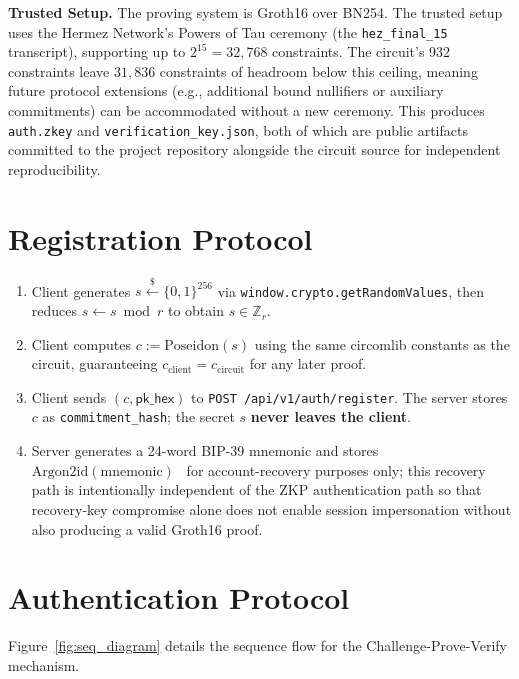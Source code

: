 \documentclass[12pt,a4paper,oneside]{report}
\begin{document}
\textbf{Trusted Setup.} The proving system is Groth16 over BN254. The
trusted setup uses the Hermez Network's Powers of Tau ceremony (the
\texttt{hez\_final\_15} transcript), supporting up to $2^{15} = 32{,}768$
constraints. The circuit's 932 constraints leave $31{,}836$ constraints of
headroom below this ceiling, meaning future protocol extensions (e.g.,
additional bound nullifiers or auxiliary commitments) can be accommodated
without a new ceremony. This produces \texttt{auth.zkey} and
\texttt{verification\_key.json}, both of which are public artifacts
committed to the project repository alongside the circuit source for
independent reproducibility.

\section{Registration Protocol}

\begin{enumerate}
  \item Client generates $s \xleftarrow{\$} \{0,1\}^{256}$ via
        \texttt{window.crypto.getRandomValues}, then reduces
        $s \leftarrow s \bmod r$ to obtain $s \in \mathbb{Z}_r$.
  \item Client computes $c := \text{Poseidon}(s)$ using the same
        circomlib constants as the circuit, guaranteeing
        $c_{\text{client}} = c_{\text{circuit}}$ for any later proof.
  \item Client sends $(c, \mathsf{pk\_hex})$ to
        \texttt{POST /api/v1/auth/register}. The server stores $c$ as
        \texttt{commitment\_hash}; the secret $s$ \textbf{never leaves the
        client}.
  \item Server generates a 24-word BIP-39 mnemonic and
        stores $\text{Argon2id}(\text{mnemonic})$~\cite{argon2} for
        account-recovery purposes only; this recovery path is intentionally
        independent of the ZKP authentication path so that recovery-key
        compromise alone does not enable session impersonation without
        also producing a valid Groth16 proof.
\end{enumerate}

\section{Authentication Protocol}
\label{sec:authprotocol}

Figure~\ref{fig:seq_diagram} details the sequence flow for the Challenge-Prove-Verify mechanism.
\end{document}
